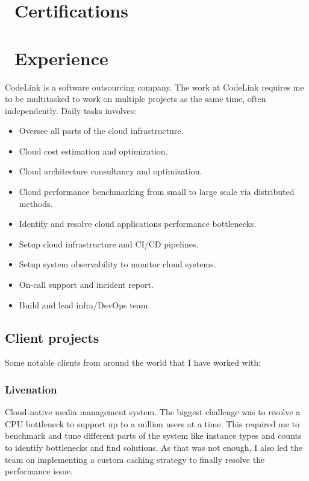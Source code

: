\documentclass{resume}
\begin{document}
\section{\faCertificate\ Certifications}

\section{\faBriefcase\ Experience}

CodeLink is a software outsourcing company. The work at CodeLink requires me to be multitasked to work on multiple projects as the same time, often independently. Daily tasks involves:
\begin{itemize}[parsep=0.5ex]
  \item Oversee all parts of the cloud infrastructure.
  \item Cloud cost estimation and optimization.
  \item Cloud architecture consultancy and optimization.
  \item Cloud performance benchmarking from small to large scale via distributed methods.
  \item Identify and resolve cloud applications performance bottlenecks.
  \item Setup cloud infrastructure and CI/CD pipelines.
  \item Setup system observability to monitor cloud systems.
  \item On-call support and incident report.
  \item Build and lead infra\slash{DevOps} team.
\end{itemize}

\subsection{{\textbf{Client projects}}}
Some notable clients from around the world that I have worked with:

\setcounter{secnumdepth}{0}
\subsubsection{{\textbf{Livenation}}}
Cloud-native media management system. The biggest challenge was to resolve a CPU bottleneck to support up to a million users at a time. This required me to benchmark and tune different parts of the system like instance types and counts to identify bottlenecks and find solutions. As that was not enough, I also led the team on implementing a custom caching strategy to finally resolve the performance issue.
\end{document}
